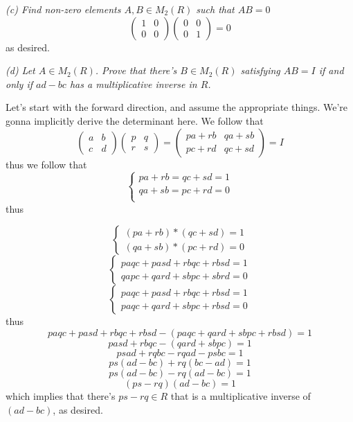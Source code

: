 \documentclass[11pt,oneside,titlepage]{book}
\begin{document}
\textit{(c) Find non-zero elements $A, B \in M_2(R)$ such that $AB =
0$}
$$
\begin{pmatrix} 1 & 0 \\ 0 & 0
\end{pmatrix}
\begin{pmatrix} 0 & 0 \\ 0 & 1
\end{pmatrix} = 0
$$
as desired.

\textit{(d) Let $A \in M_2(R)$. Prove that there's $B \in M_2(R)$
satisfying $AB = I$ if and only if $ad - bc$ has a multiplicative
inverse in $R$.}

Let's start with the forward direction, and assume the appropriate
things. We're gonna implicitly derive the determinant here. We follow
that
$$
\begin{pmatrix} a & b \\ c & d
\end{pmatrix}
\begin{pmatrix} p & q \\ r & s
\end{pmatrix} =
\begin{pmatrix} pa + rb & qa + sb \\ pc + rd & qc + sd
\end{pmatrix} = I
$$
thus we follow that
$$
\begin{cases} pa + rb = qc + sd = 1 \\ qa + sb = pc + rd = 0 \\
\end{cases}
$$
thus

$$
\begin{cases} (pa + rb) * (qc + sd) = 1 \\ (qa + sb) * (pc + rd) = 0
\end{cases}
$$
$$
\begin{cases} paqc + pasd + rbqc + rbsd = 1 \\ qapc + qard + sbpc +
sbrd = 0
\end{cases}
$$
$$
\begin{cases} paqc + pasd + rbqc + rbsd = 1 \\ paqc + qard + sbpc +
rbsd = 0
\end{cases}
$$
thus
$$ paqc + pasd + rbqc + rbsd -   (paqc + qard + sbpc + rbsd) = 1 $$
$$ pasd + rbqc - (qard + sbpc) = 1 $$
$$ psad + rqbc - rqad - psbc = 1 $$
$$ ps(ad - bc) + rq(bc - ad) = 1 $$
$$ ps(ad - bc) - rq(ad - bc) = 1 $$
$$ (ps - rq) (ad - bc) = 1 $$
which implies that there's $ps - rq \in R$ that is a multiplicative
inverse of $(ad - bc)$, as desired.
\end{document}
